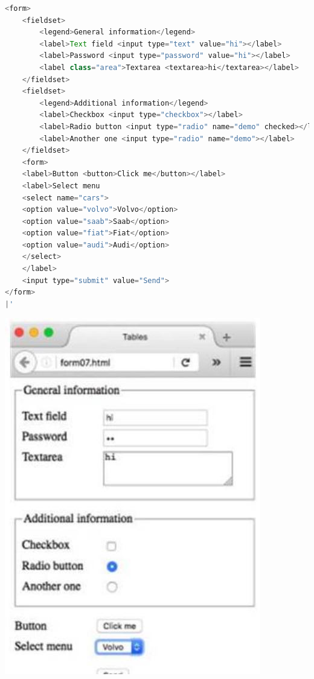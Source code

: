 \begin{lstlisting}[language=JavaScript, style=basesmol]
<form>
    <fieldset>
        <legend>General information</legend>
        <label>Text field <input type="text" value="hi"></label>
        <label>Password <input type="password" value="hi"></label>
        <label class="area">Textarea <textarea>hi</textarea></label>
    </fieldset>
    <fieldset>
        <legend>Additional information</legend>
        <label>Checkbox <input type="checkbox"></label>
        <label>Radio button <input type="radio" name="demo" checked></label>
        <label>Another one <input type="radio" name="demo"></label>
    </fieldset>
    <form>
    <label>Button <button>Click me</button></label>
    <label>Select menu
    <select name="cars">
    <option value="volvo">Volvo</option>
    <option value="saab">Saab</option>
    <option value="fiat">Fiat</option>
    <option value="audi">Audi</option>
    </select>
    </label>
    <input type="submit" value="Send">
</form>
|'
\end{lstlisting}

\begin{center}
\includegraphics[width=\linewidth]{images/2024_12_29_858f09cde51177c71657g-29}
\end{center}


